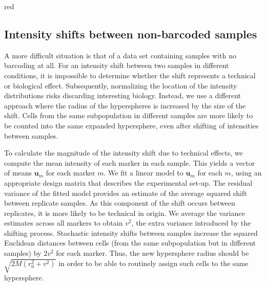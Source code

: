 \documentclass{article}
\begin{document}
\begin{color}{red}
\subsection{Intensity shifts between non-barcoded samples}
A more difficult situation is that of a data set containing samples with no barcoding at all.
For an intensity shift between two samples in different conditions, it is impossible to determine whether the shift represents a technical or biological effect.
Subsequently, normalizing the location of the intensity distributions risks discarding interesting biology.
Instead, we use a different approach where the radius of the hyperspheres is increased by the size of the shift.
Cells from the same subpopulation in different samples are more likely to be counted into the same expanded hypersphere, even after shifting of intensities between samples.

To calculate the magnitude of the intensity shift due to technical effects, we compute the mean intensity of each marker in each sample.
This yields a vector of means $\mathbf{u}_m$ for each marker $m$.
We fit a linear model to $\mathbf{u}_m$ for each $m$, using an appropriate design matrix that describes the experimental set-up.
The residual variance of the fitted model provides an estimate of the average squared shift between replicate samples.
As this component of the shift occurs between replicates, it is more likely to be technical in origin.
We average the variance estimates across all markers to obtain $v^2$, the extra variance introduced by the shifting process.
Stochastic intensity shifts between samples increase the squared Euclidean distances between cells (from the same subpopulation but in different samples) by $2v^2$ for each marker.
Thus, the new hypersphere radius should be $\sqrt{2M(r_0^2 + v^2)}$ in order to be able to routinely assign such cells to the same hypersphere.



\end{color}
\end{document}
